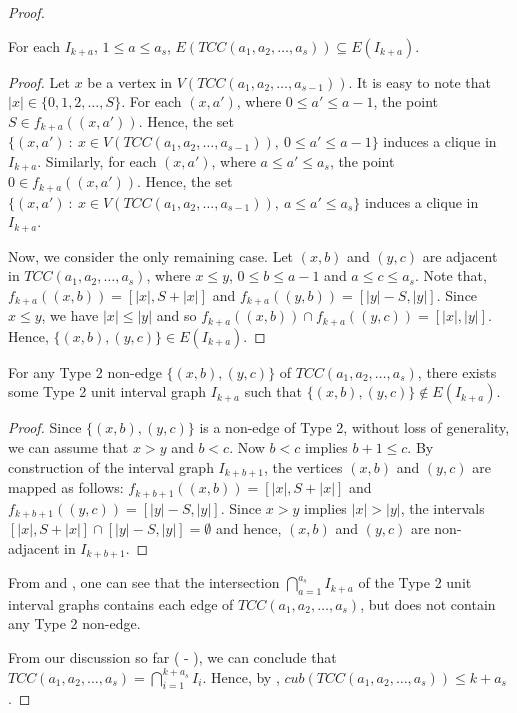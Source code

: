 \documentclass[10pt,a4paper]{amsart}
\newcommand{\TT}{TCC(a_1,a_2,\dots,a_s)}
\newcommand{\T}{TCC(a_1,a_2,\dots,a_{s-1})}
\begin{document}
\begin{proof}
\begin{claim}\label{Type 2 interval graphs are supergraphs}
    For each $I_{k+a}$, $1 \leq a \leq a_s$, $E(\TT) \subseteq E(I_{k+a})$.
\end{claim}
\begin{proof}
    Let $x$ be a vertex in $V(\T)$. It is easy to note that $|x| \in \{0,1,2,\dots,S\}$. For each $(x,a')$, where $0\leq a' \leq a-1$, the point $S \in f_{k+a} ((x,a'))$. Hence, the set $\{(x,a') \ : \ x \in V(\T), \ 0 \leq a' \leq a-1\}$ induces a clique in $I_{k+a}$. Similarly, for each $(x,a')$, where $a\leq a' \leq a_s$, the point $0 \in f_{k+a} ((x,a'))$. Hence, the set $\{(x,a') \ : \ x \in V(\T), \ a \leq a' \leq a_s\}$ induces a clique in $I_{k+a}$.

    Now, we consider the only remaining case. Let $(x,b)$ and $(y,c)$ are adjacent in $\TT$, where $x \leq y$, $0 \leq b \leq a-1$ and $a \leq c \leq a_s$. Note that, $f_{k+a}((x,b))=[|x|,S + |x|]$ and $f_{k+a}((y,b))=[|y|-S,|y|]$. Since $x \leq y$, we have $|x| \leq |y|$ and so $f_{k+a}((x,b)) \cap f_{k+a}((y,c))= [|x|,|y|]$. Hence, $\{(x,b),(y,c)\} \in E(I_{k+a})$.
\end{proof}

\begin{claim}\label{Type 2 interval graphs and non-edge}
    For any Type 2 non-edge $\{(x,b),(y,c)\}$ of $\TT$,
    there exists some Type 2 unit interval graph $I_{k+a}$ such that $\{(x,b),(y,c)\} \notin E(I_{k+a})$.
\end{claim}
\begin{proof}
    Since $\{(x,b),(y,c)\}$ is a non-edge of Type 2, without loss of generality, we can assume that $x >y$ and $b < c$. Now $b < c$ implies $b+1 \leq c$. By construction of the interval graph $I_{k+b+1}$, the vertices $(x,b)$ and $(y,c)$ are mapped as follows: $f_{k+b+1}((x,b))=[|x|,S+|x|]$ and $f_{k+b+1}((y,c))=[|y|-S,|y|]$. Since $x > y$ implies $|x| > |y|$, the intervals $[|x|,S+|x|]\cap [|y|-S,|y|] = \emptyset$ and hence, $(x,b)$ and $(y,c)$ are non-adjacent in $I_{k+b+1}$.
\end{proof}

  From  and , one can see that the intersection $\bigcap_{a=1}^{a_s}I_{k+a}$ of the Type 2 unit interval graphs contains each edge of $\TT$, but does not contain any Type 2 non-edge.
  
  From our discussion so far ( - ), we can conclude that $\TT=\bigcap_{i=1}^{k+a_s}I_i$. Hence, by , $cub(\TT) \leq k+a_s$. 
\end{proof}
\end{document}
